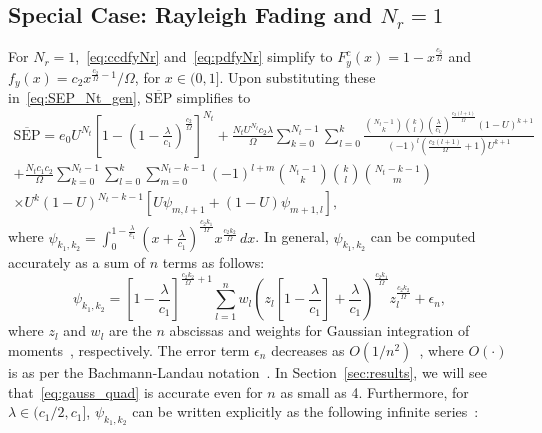 \documentclass[12pt,draftcls,peerreview,onecolumn]{IEEEtran}
\newcommand{\SEP}{\text{SEP}}
\newcommand{\nck}[2]{\binom{#1}{#2}}
\newcommand{\lam}{\lambda}
\newcommand{\error}{\epsilon_n}
\newcommand{\Nt}{{N_t}}
\newcommand{\Nr}{{N_r}}
\newcommand{\cone}{c_{1}}
\newcommand{\ctwo}{c_{2}}
\newcommand{\lambym}{\frac{\lam}{\cone}}
\newcommand{\al}{\ctwo}
\newcommand{\snr}{\Omega}
\newcommand{\albysnr}[1][]{\frac{\al#1}{\snr}}
\newcommand{\un}{U}
\newcommand{\psifun}[2]{\psi_{{#1},{#2}}}
\newcommand{\onemlc}{\left[1-\lambym\right]}
\newcommand{\zerosep}{e_0}
\newcommand{\avgSEP}{\overline{\SEP}}
\begin{document}
\subsection{Special Case: Rayleigh Fading and $\Nr=1$} 
For $\Nr=1$,~\eqref{eq:ccdfyNr} and~\eqref{eq:pdfyNr} simplify to $F_{y}^{c}(x) = 1-x^{\albysnr}$ and $f_{y}(x) = \al x^{\albysnr-1}/\snr$, for $x \in (0,1]$. Upon substituting these in~\eqref{eq:SEP_Nt_gen}, $\avgSEP$ simplifies to 
%
\newcommand{\lidx}{l}
\newcommand{\midx}{m}
\begin{multline}
\label{eq:avgSEPoneNr} 
\avgSEP =\zerosep\un^{\Nt}\!\left[1-\left(1-\lambym\right)^{\!\albysnr[]}\right]^{\Nt}
+ \frac{\Nt\un^{\Nt}\al\lam}{\snr} \sum_{k=0}^{\Nt-1}\sum_{\lidx=0}^{k} \frac{\nck{\Nt-1}{k} \nck{k}{\lidx}\left(\lambym\right)^{\albysnr[(\lidx+1)]}\left(1-\un\right)^{k+1} }{(-1)^{\lidx} \left( \albysnr[(\lidx+1)]+1\right)\un^{k+1} }\\ + \frac{\Nt\cone\al}{\snr} \sum_{k=0}^{\Nt-1} \sum_{\lidx=0}^{k} \sum_{\midx=0}^{\Nt-k-1} (-1)^{\lidx+\midx}  \binom{\Nt-1}{k} \binom{k}{\lidx} \binom{\Nt-k-1}{\midx} \\\times\un^{k} (1-\un)^{\Nt-k-1} \left[ \un\psifun{\midx}{\lidx+1} +  \left(1-\un\right) \psifun{\midx+1}{\lidx} \right]
,
\end{multline}
where $\psifun{k_1}{k_2} = \int_{0}^{1-\frac{\lam}{\cone}} \left(x+\lambym\right)^{\albysnr[k_1]} x^{\albysnr[k_2]} \,dx$.
%
\newcommand{\gqsym}{z_{\lidx}}
\newcommand{\gqwt}{w_{\lidx}}
In general, $\psifun{k_1}{k_2}$ can be computed accurately as a sum of $n$  terms as follows: 
\begin{equation}
\psifun{k_1}{k_2} ={\onemlc^{\albysnr[k_2]+1}} \sum_{\lidx=1}^{n} \gqwt {\left(\!\gqsym\onemlc +\lambym\right)}^{\albysnr[k_1]} \gqsym^{\albysnr[k_2]} + \error,
\label{eq:gauss_quad}
\end{equation}
where $\gqsym$ and $\gqwt$ are the $n$ abscissas and weights for Gaussian integration of moments~\cite[pp 921-922]{abramowitz_stegun}, respectively. The error term $\error$ decreases as $O(1/n^2)$~\cite{Xiang_2012_SIAM}, where $O(\cdot)$ is as per the Bachmann-Landau notation~\cite[Chap. 3]{CLRS_algo_book}. In Section~\ref{sec:results}, we will see that~\eqref{eq:gauss_quad}  is accurate even for $n$ as small as 4. Furthermore, for $\lam\in({\cone}/{2}, \cone]$, $\psifun{k_1}{k_2}$ can be written explicitly as the following infinite series~\cite{gradshteyn00_book}:
%
\end{document}
